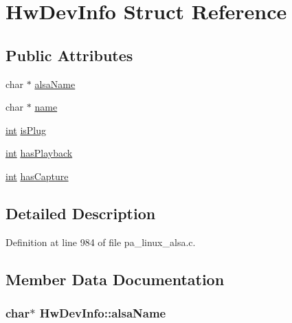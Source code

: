 \hypertarget{struct_hw_dev_info}{}\section{Hw\+Dev\+Info Struct Reference}
\label{struct_hw_dev_info}
\subsection*{Public Attributes}
\begin{DoxyCompactItemize}
\item 
char $\ast$ \hyperlink{struct_hw_dev_info_a9c51cd40ef6da3c3fc4a52ec02796092}{alsa\+Name}
\item 
char $\ast$ \hyperlink{struct_hw_dev_info_ada014cb1067ae4696a3f7b5e40819971}{name}
\item 
\hyperlink{xmltok_8h_a5a0d4a5641ce434f1d23533f2b2e6653}{int} \hyperlink{struct_hw_dev_info_a3afbd357df38d146cf8d223cbbe4930f}{is\+Plug}
\item 
\hyperlink{xmltok_8h_a5a0d4a5641ce434f1d23533f2b2e6653}{int} \hyperlink{struct_hw_dev_info_a11200ea7796a9a1c1a44a23e03eef21e}{has\+Playback}
\item 
\hyperlink{xmltok_8h_a5a0d4a5641ce434f1d23533f2b2e6653}{int} \hyperlink{struct_hw_dev_info_a80ee49eb62fed3f40aa4e49591c23980}{has\+Capture}
\end{DoxyCompactItemize}


\subsection{Detailed Description}


Definition at line 984 of file pa\+\_\+linux\+\_\+alsa.\+c.



\subsection{Member Data Documentation}
\subsubsection[{\texorpdfstring{alsa\+Name}{alsaName}}]{\setlength{\rightskip}{0pt plus 5cm}char$\ast$ Hw\+Dev\+Info\+::alsa\+Name}\hypertarget{struct_hw_dev_info_a9c51cd40ef6da3c3fc4a52ec02796092}{}\label{struct_hw_dev_info_a9c51cd40ef6da3c3fc4a52ec02796092}



